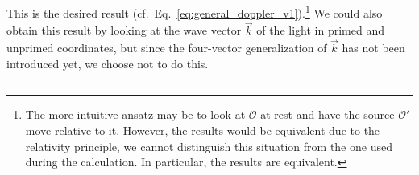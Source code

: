 \documentclass[../relativity_main.tex]{subfiles}
\begin{document}
This is the desired result (cf.~Eq.~\eqref{eq:general_doppler_v1}).\footnote{The more intuitive ansatz may be to look at $\mathcal{O}$ at rest and have the source $\mathcal{O}'$ move relative to it. However, the results would be equivalent due to the relativity principle, we cannot distinguish this situation from the one used during the calculation. In particular, the results are equivalent.} We could also obtain this result by looking at the wave vector $\vec{k}$ of the light in primed and unprimed coordinates, but since the four-vector generalization of $\vec{k}$ has not been introduced yet, we choose not to do this.


\hrule




\end{document}
